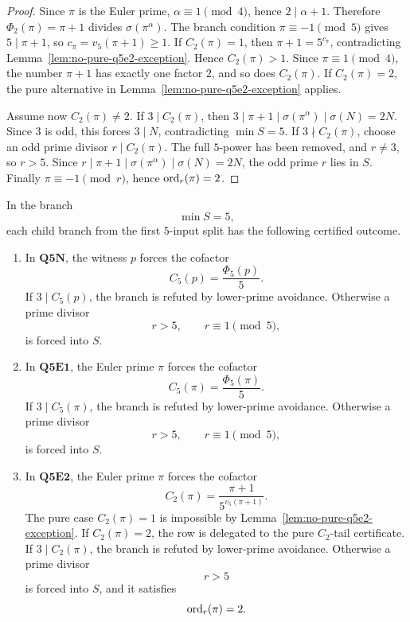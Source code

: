 \begin{proof}
Since \(\pi\) is the Euler prime, \(\alpha\equiv1\pmod4\), hence
\(2\mid\alpha+1\).  Therefore \(\Phi_2(\pi)=\pi+1\) divides
\(\sigma(\pi^\alpha)\).  The branch condition \(\pi\equiv-1\pmod5\) gives
\(5\mid\pi+1\), so \(c_\pi=v_5(\pi+1)\ge1\).  If \(C_2(\pi)=1\), then
\(\pi+1=5^{c_\pi}\), contradicting Lemma~\ref{lem:no-pure-q5e2-exception}.
Hence \(C_2(\pi)>1\).  Since \(\pi\equiv1\pmod4\), the number \(\pi+1\) has
exactly one factor \(2\), and so does \(C_2(\pi)\).  If \(C_2(\pi)=2\), the
pure alternative in Lemma~\ref{lem:no-pure-q5e2-exception} applies.

Assume now \(C_2(\pi)\ne2\).  If \(3\mid C_2(\pi)\), then
\(3\mid\pi+1\mid\sigma(\pi^\alpha)\mid\sigma(N)=2N\).  Since \(3\) is odd,
this forces \(3\mid N\), contradicting \(\min S=5\).  If
\(3\nmid C_2(\pi)\), choose an odd prime divisor \(r\mid C_2(\pi)\).  The full
\(5\)-power has been removed, and \(r\ne3\), so \(r>5\).  Since
\(r\mid\pi+1\mid\sigma(\pi^\alpha)\mid\sigma(N)=2N\), the odd prime \(r\)
lies in \(S\).  Finally \(\pi\equiv-1\pmod r\), hence \(\operatorname{ord}_r(\pi)=2\).
\end{proof}

\begin{corollary}
\label{cor:q5-first-input-forced-reduction}
In the branch
\[
  \min S=5,
\]
each child branch from the first \(5\)-input split has the following certified
outcome.

\begin{enumerate}[label=(\roman*),leftmargin=2.2em]

\item In \(\mathbf{Q5N}\), the witness \(p\) forces the cofactor
      \[
        C_5(p)=\frac{\Phi_5(p)}5.
      \]
      If \(3\mid C_5(p)\), the branch is refuted by lower-prime avoidance.
      Otherwise a prime divisor
      \[
        r>5,\qquad r\equiv1\pmod5,
      \]
      is forced into \(S\).

\item In \(\mathbf{Q5E1}\), the Euler prime \(\pi\) forces the cofactor
      \[
        C_5(\pi)=\frac{\Phi_5(\pi)}5.
      \]
      If \(3\mid C_5(\pi)\), the branch is refuted by lower-prime avoidance.
      Otherwise a prime divisor
      \[
        r>5,\qquad r\equiv1\pmod5,
      \]
      is forced into \(S\).

\item In \(\mathbf{Q5E2}\), the Euler prime \(\pi\) forces the cofactor
      \[
        C_2(\pi)=\frac{\pi+1}{5^{v_5(\pi+1)}}.
      \]
      The pure case \(C_2(\pi)=1\) is impossible by
      Lemma~\ref{lem:no-pure-q5e2-exception}.  If \(C_2(\pi)=2\), the row is
      delegated to the pure \(C_2\)-tail certificate.  If \(3\mid C_2(\pi)\),
      the branch is refuted by lower-prime avoidance.  Otherwise a prime divisor
      \[
        r>5
      \]
      is forced into \(S\), and it satisfies
      \[
        \operatorname{ord}_r(\pi)=2.
      \]
\end{enumerate}
\end{corollary}

